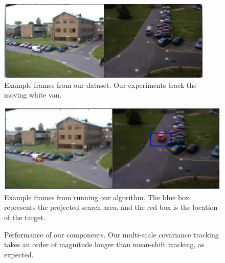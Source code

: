 \documentclass{article}
\begin{document}
\begin{figure}[t]
\centering
\includegraphics[width=\textwidth]{dataset.png}
\caption{Example frames from our dataset. Our experiments track the moving white van.}\label{fig:dataset}
\end{figure}

\begin{figure}[t]
\centering
\includegraphics[width=\textwidth]{results.png}
\caption{Example frames from running our algorithm. The blue box represents the projected search area, and the red box is the location of the target.}\label{fig:results}
\end{figure}

\begin{figure}[t]
\centering
{}
\caption{Performance of our components. Our multi-scale covariance tracking takes an order of magnitude longer than mean-shift tracking, as expected.}\label{fig:perf}
\end{figure}
\end{document}
